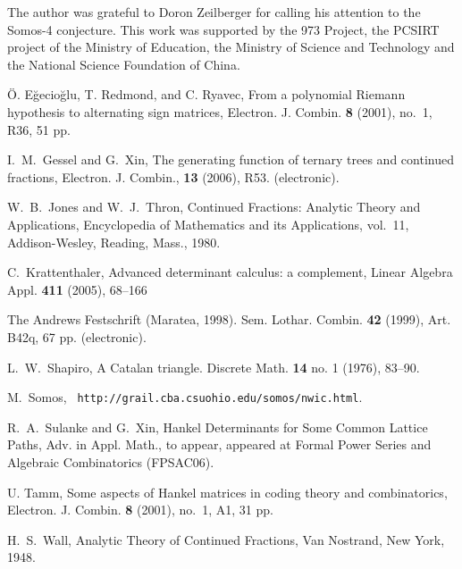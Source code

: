 \documentclass{fpsac}
\begin{document}
 The author was grateful to Doron
Zeilberger for calling his attention to the Somos-4 conjecture. This
work was supported by the 973 Project, the PCSIRT project of the
Ministry of Education, the Ministry of Science and Technology and
the National Science Foundation of China.



\providecommand{\bysame}{\leavevmode\hbox
to3em{\hrulefill}\thinspace}
\providecommand{\MR}{\relax\ifhmode\unskip\space\fi MR }
\providecommand{\MRhref}[2]{  \href{http://www.ams.org/mathscinet-getitem?mr=#1}{#2}
} \providecommand{\href}[2]{#2}
\begin{thebibliography}{10}

{\"O}. E{\u{g}}ecio{\u{g}}lu, T. Redmond, and C. Ryavec, {{{From
a polynomial {R}iemann hypothesis to alternating sign matrices}}},
Electron. J. Combin. \textbf{8} (2001), no.~1,  R36, 51 pp.

I.~M.~Gessel and G.~Xin, {{{The generating function of ternary
trees and
  continued fractions}}}, Electron. J. Combin., \textbf{13} (2006), R53. (electronic).

W.~B.~Jones and W.~J.~Thron, {{{Continued Fractions: Analytic
Theory and Applications}}},
  Encyclopedia of Mathematics and its Applications, vol.~11, Addison-Wesley, Reading, Mass., 1980.

 C.~Krattenthaler,
 Advanced determinant calculus: a complement, {{{Linear Algebra
     Appl.}}} \textbf{411} (2005), 68--166

The Andrews Festschrift (Maratea, 1998). {{{Sem. Lothar. Combin.}}}
\textbf{42} (1999), Art. B42q, 67 pp. (electronic).

  L.~W.~Shapiro,  A Catalan triangle. {{{Discrete Math.}}} \textbf{14} no. 1  (1976),  83--90.

M.~Somos, {\tt
http://grail.cba.csuohio.edu/\raisebox{-3pt}{\~{}}somos/nwic.html}.

  R.~A.~Sulanke and G.~Xin,
Hankel Determinants for Some Common Lattice Paths, {{{Adv. in
Appl. Math.}}}, to appear, appeared at Formal Power Series and
Algebraic Combinatorics (FPSAC06).

U. Tamm, {{{Some aspects of {H}ankel matrices in coding theory
and combinatorics}}}, Electron. J. Combin. \textbf{8} (2001), no.~1,
A1, 31 pp.

H.~S.~Wall, {{{Analytic Theory of Continued Fractions}}}, Van
Nostrand, New York, 1948.

\end{thebibliography}
\end{document}
